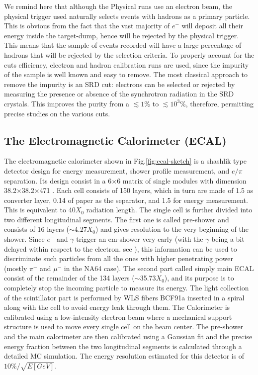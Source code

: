 We remind here that although the Physical runs use an electron beam, the physical trigger used naturally selects events with hadrons as a primary particle. This is obvious from the fact that the vast majority of $e^-$ will deposit all their energy inside the target-dump, hence will be rejected by the physical trigger. This means that the sample of events recorded will have a large percentage of hadrons that will be rejected by the selection criteria. To properly account for the cuts efficiency, electron and hadron calibration runs are used, since the impurity of the sample is well known and easy to remove. The most classical approach to remove the impurity is an SRD cut: electrons can be selected or rejected by measuring the presence or absence of the synchrotron radiation in the SRD crystals. This improves the purity from a $\lesssim 1\%$ to $\lesssim 10^{3}\%$, therefore, permitting precise studies on the various cuts. 

\subsection{The Electromagnetic Calorimeter (ECAL)}
\label{ch2:sec:detectors-ecal}

The electromagnetic calorimeter shown in Fig.\ref{fig:ecal-sketch} is a shashlik type detector design for energy measurement, shower profile measurement, and $e/\pi$ separation. Its design consist in a 6$\times$6 matrix of single modules with dimension 38.2$\times$38.2$\times$471 \mmc. Each cell consists of 150 layers, which in turn are made of 1.5 \mmi as converter layer, 0.14 \mmi of paper as the separator, and 1.5 \mmi for energy measurement. This is equivalent to 40$X_0$ radiation length. The single cell is further divided into two different longitudinal segments. The first one is called pre-shower and consists of 16 layers ($\sim$4.27$X_0$) and gives resolution to the very beginning of the shower. Since $e^-$ and $\gamma$ trigger an em-shower very early (with the $\gamma$ being a bit delayed within respect to the electron. see \cite{Bichsel:2002cf}), this information can be used to discriminate such particles from all the ones with higher penetrating power (mostly $\pi^-$ and $\mu^-$ in the NA64 case). The second part called simply main ECAL consist of the remainder of the 134 layers ($\sim$35.73$X_0$), and its purpose is to completely stop the incoming particle to measure its energy. The light collection of the scintillator part is performed by WLS fibers BCF91a \cite{wls-fibers} inserted in a spiral along with the cell to avoid energy leak through them. The Calorimeter is calibrated using a low-intensity electron beam where a mechanical support structure is used to move every single cell on the beam center. The pre-shower and the main calorimeter are then calibrated using a Gaussian fit and the precise energy fraction between the two longitudinal segments is calculated through a detailed MC simulation. The energy resolution estimated for this detector is of $10\% / \sqrt{E[GeV]}$.


